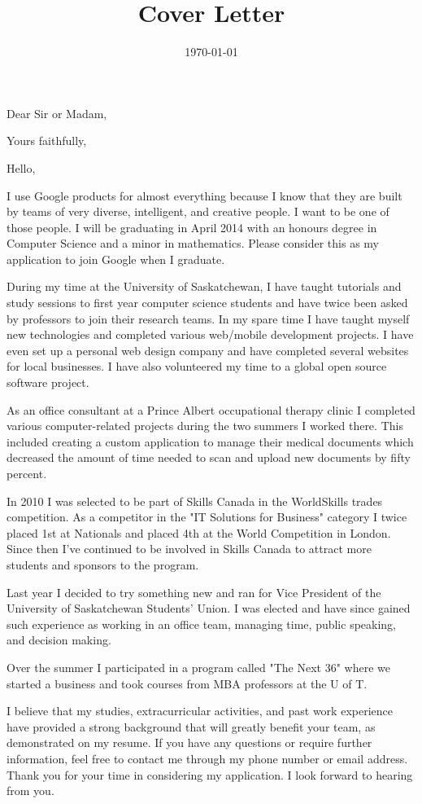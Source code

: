 \documentclass[11pt,a4paper,sans]{moderncv}        %
\title{Cover Letter}                               %
\begin{document}
\date{\today{}}
\opening{Dear Sir or Madam,}
\closing{Yours faithfully,}
\makelettertitle

Hello,

I use Google products for almost everything because I know that they are built by teams of very diverse, intelligent, and creative people. I want to be one of those people. I will be graduating in April 2014 with an honours degree in Computer Science and a minor in mathematics. Please consider this as my application to join Google when I graduate.

During my time at the University of Saskatchewan, I have taught tutorials and study sessions to first year computer science students and have twice been asked by professors to join their research teams. In my spare time I have taught myself new technologies and completed various web/mobile development projects. I have even set up a personal web design company and have completed several websites for local businesses. I have also volunteered my time to a global open source software project.

As an office consultant at a Prince Albert occupational therapy clinic I completed various computer-related projects during the two summers I worked there. This included creating a custom application to manage their medical documents which decreased the amount of time needed to scan and upload new documents by fifty percent.

In 2010 I was selected to be part of Skills Canada in the WorldSkills trades competition. As a competitor in the "IT Solutions for Business" category I twice placed 1st at Nationals and placed 4th at the World Competition in London. Since then I’ve continued to be involved in Skills Canada to attract more students and sponsors to the program.

Last year I decided to try something new and ran for Vice President of the University of Saskatchewan Students’ Union. I was elected and have since gained such experience as working in an office team, managing time, public speaking, and decision making. 

Over the summer I participated in a program called "The Next 36" where we started a business and took courses from MBA professors at the U of T.

I believe that my studies, extracurricular activities, and past work experience have provided a strong background that will greatly benefit your team, as demonstrated on my resume. If you have any questions or require further information, feel free to contact me through my phone number or email address. Thank you for your time in considering my application. I look forward to hearing from you.

\makeletterclosing
\end{document}
